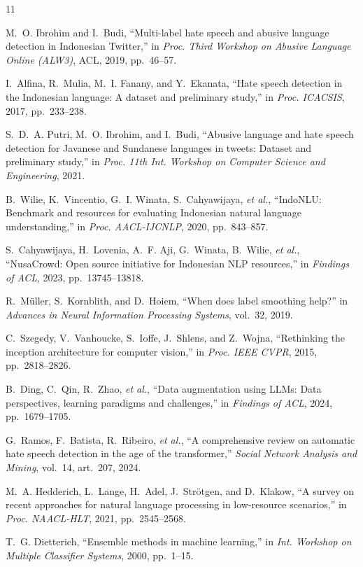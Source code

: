 \documentclass[10pt,twocolumn]{article}
\begin{document}
\begin{thebibliography}{11}

M.~O. Ibrohim and I.~Budi, ``Multi-label hate speech and abusive language detection in Indonesian Twitter,'' in \textit{Proc. Third Workshop on Abusive Language Online (ALW3)}, ACL, 2019, pp.~46--57.

I.~Alfina, R.~Mulia, M.~I. Fanany, and Y.~Ekanata, ``Hate speech detection in the Indonesian language: A dataset and preliminary study,'' in \textit{Proc. ICACSIS}, 2017, pp.~233--238.

S.~D.~A. Putri, M.~O. Ibrohim, and I.~Budi, ``Abusive language and hate speech detection for Javanese and Sundanese languages in tweets: Dataset and preliminary study,'' in \textit{Proc. 11th Int. Workshop on Computer Science and Engineering}, 2021.

B.~Wilie, K.~Vincentio, G.~I. Winata, S.~Cahyawijaya, \textit{et al.}, ``IndoNLU: Benchmark and resources for evaluating Indonesian natural language understanding,'' in \textit{Proc. AACL-IJCNLP}, 2020, pp.~843--857.

S.~Cahyawijaya, H.~Lovenia, A.~F. Aji, G.~Winata, B.~Wilie, \textit{et al.}, ``NusaCrowd: Open source initiative for Indonesian NLP resources,'' in \textit{Findings of ACL}, 2023, pp.~13745--13818.

R.~M\"uller, S.~Kornblith, and D.~Hoiem, ``When does label smoothing help?'' in \textit{Advances in Neural Information Processing Systems}, vol.~32, 2019.

C.~Szegedy, V.~Vanhoucke, S.~Ioffe, J.~Shlens, and Z.~Wojna, ``Rethinking the inception architecture for computer vision,'' in \textit{Proc. IEEE CVPR}, 2015, pp.~2818--2826.

B.~Ding, C.~Qin, R.~Zhao, \textit{et al.}, ``Data augmentation using LLMs: Data perspectives, learning paradigms and challenges,'' in \textit{Findings of ACL}, 2024, pp.~1679--1705.

G.~Ramos, F.~Batista, R.~Ribeiro, \textit{et al.}, ``A comprehensive review on automatic hate speech detection in the age of the transformer,'' \textit{Social Network Analysis and Mining}, vol.~14, art.~207, 2024.

M.~A. Hedderich, L.~Lange, H.~Adel, J.~Str\"otgen, and D.~Klakow, ``A survey on recent approaches for natural language processing in low-resource scenarios,'' in \textit{Proc. NAACL-HLT}, 2021, pp.~2545--2568.

T.~G. Dietterich, ``Ensemble methods in machine learning,'' in \textit{Int. Workshop on Multiple Classifier Systems}, 2000, pp.~1--15.

\end{thebibliography}
\end{document}
